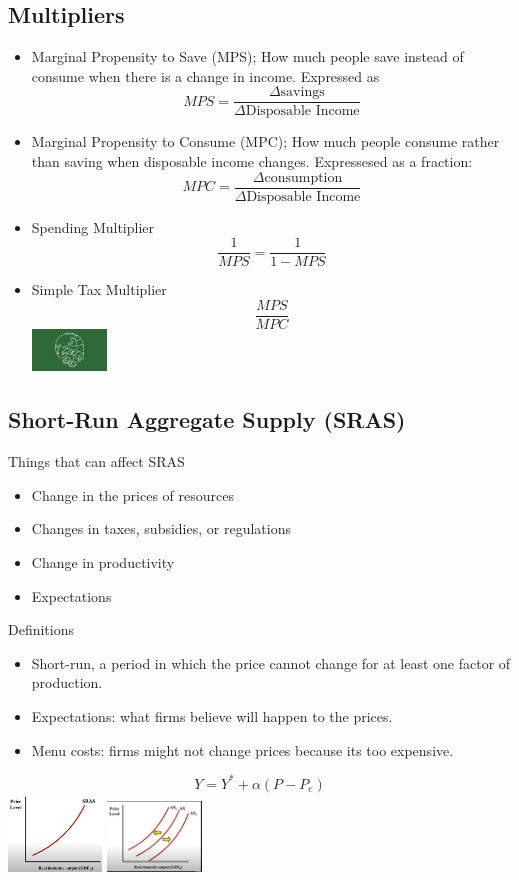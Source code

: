 \documentclass[8pt]{beamer}
\begin{document}
  \begin{frame}
	\section{Multipliers}
	\begin{itemize}
		\item Marginal Propensity to Save (MPS); How much people save instead of
		consume when there is a change in income. Expressed as $$MPS=\frac{\Delta \text{savings}}{\Delta \text {Disposable Income}}$$
		\item Marginal Propensity to Consume (MPC); How much people consume
		rather than saving when disposable income changes. Expressesed as a fraction:
		$$MPC = \frac{\Delta \text{consumption}}{\Delta \text{Disposable Income}}$$
		\item Spending Multiplier
		$$\frac{1}{MPS} = \frac{1}{1 - MPS}$$
		\item Simple Tax Multiplier
		$$\frac{MPS}{MPC}$$
		\center \includegraphics[width=2cm]{2021-10-12-12-10-06.png}
	\end{itemize}
  \end{frame}
  \begin{frame}
	\section{Short-Run Aggregate Supply (SRAS)}
	Things that can affect SRAS
	\begin{itemize}
		\item Change in the prices of resources
		\item Changes in taxes, subsidies, or regulations
		\item Change in productivity
		\item Expectations
	\end{itemize}
	Definitions
	\begin{itemize}
		\item Short-run, a period in which the price cannot change for at least one factor of production.
		\item Expectations: what firms believe will happen to the prices.
		\item Menu costs: firms might not change prices because its too expensive.
	\end{itemize}
	$$Y = Y^* + \alpha(P-P_e)$$
	\includegraphics[width=2.5cm]{2021-10-12-12-11-36.png} \includegraphics[width=2.5cm]{2021-10-12-12-12-26.png}
  \end{frame}
\end{document}
